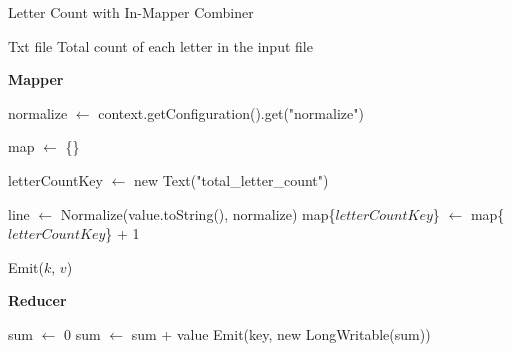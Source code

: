 \begin{algorithm}[H]
    \caption{Letter Count with In-Mapper Combiner}
    \begin{algorithmic}[1]
    \Require Txt file
    \Ensure Total count of each letter in the input file
    
    \vspace{1em}

    \Statex
    \noindent \textbf{Mapper}
        

            \State normalize $\leftarrow$ context.getConfiguration().get("normalize")

            \State map $\leftarrow$ \{\}

            \State letterCountKey $\leftarrow$ new Text("total\_letter\_count")

        \EndProcedure
    
        \vspace{1em}

            \State line $\leftarrow$ Normalize(value.toString(), normalize)
                \State map\{{$letterCountKey$}\} $\leftarrow$ map\{{$letterCountKey$}\} + 1
            \EndFor
        \EndProcedure
    
        \vspace{1em}

                \State Emit($k$, $v$) 
            \EndFor
        \EndProcedure
    
        \vspace{1em}

    \Statex
    \noindent \textbf{Reducer}

    
            \State sum $\leftarrow$ 0
                \State sum $\leftarrow$ sum + value
            \EndFor
            \State Emit(key, new LongWritable(sum))
        \EndProcedure

    \end{algorithmic}
    \end{algorithm}
    

